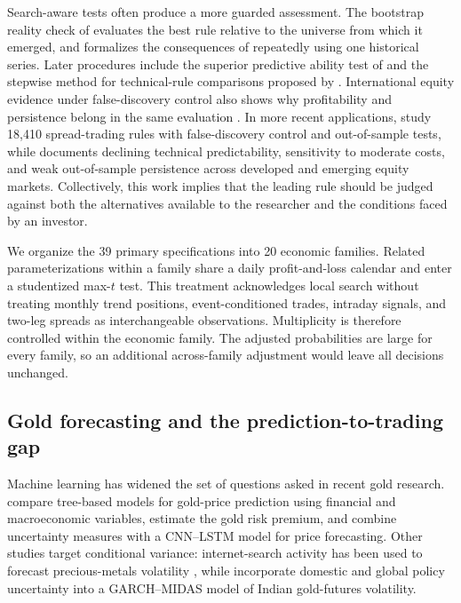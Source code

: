 Search-aware tests often produce a more guarded assessment. The bootstrap reality check of \citet{sullivan1999} evaluates the best rule relative to the universe from which it emerged, and \citet{white2000} formalizes the consequences of repeatedly using one historical series. Later procedures include the superior predictive ability test of \citet{hansen2005} and the stepwise method for technical-rule comparisons proposed by \citet{hsu2010}. International equity evidence under false-discovery control also shows why profitability and persistence belong in the same evaluation \citep{sermpinis2021}. In more recent applications, \citet{psaradellis2023} study 18,410 spread-trading rules with false-discovery control and out-of-sample tests, while \citet{rink2023} documents declining technical predictability, sensitivity to moderate costs, and weak out-of-sample persistence across developed and emerging equity markets. Collectively, this work implies that the leading rule should be judged against both the alternatives available to the researcher and the conditions faced by an investor.

We organize the 39 primary specifications into 20 economic families. Related parameterizations within a family share a daily profit-and-loss calendar and enter a studentized max-$t$ test. This treatment acknowledges local search without treating monthly trend positions, event-conditioned trades, intraday signals, and two-leg spreads as interchangeable observations. Multiplicity is therefore controlled within the economic family. The adjusted probabilities are large for every family, so an additional across-family adjustment would leave all decisions unchanged.

\subsection{Gold forecasting and the prediction-to-trading gap}

Machine learning has widened the set of questions asked in recent gold research. \citet{cohen2023} compare tree-based models for gold-price prediction using financial and macroeconomic variables, \citet{diaz2023} estimate the gold risk premium, and \citet{you2025} combine uncertainty measures with a CNN--LSTM model for price forecasting. Other studies target conditional variance: internet-search activity has been used to forecast precious-metals volatility \citep{li2024}, while \citet{simran2025} incorporate domestic and global policy uncertainty into a GARCH--MIDAS model of Indian gold-futures volatility.

